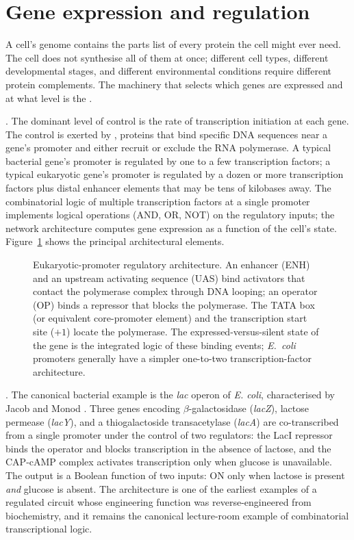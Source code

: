 \section{Gene expression and regulation}

A cell's genome contains the parts list of every protein the cell
might ever need. The cell does not synthesise all of them at once;
different cell types, different developmental stages, and different
environmental conditions require different protein complements. The
machinery that selects which genes are expressed and at what level is
the .

. The dominant level of control is
the rate of transcription initiation at each gene. The control is
exerted by , proteins that bind
specific DNA sequences near a gene's promoter and either recruit or
exclude the RNA polymerase. A typical bacterial gene's promoter is
regulated by one to a few transcription factors; a typical
eukaryotic gene's promoter is regulated by a dozen or more
transcription factors plus distal enhancer elements that may be tens
of kilobases away. The combinatorial logic of multiple transcription
factors at a single promoter implements logical operations (AND, OR,
NOT) on the regulatory inputs; the network architecture computes
gene expression as a function of the cell's state.
Figure~\ref{fig:regulation-circuit} shows the principal architectural
elements.

\begin{figure}[h]
\centering

\caption{Eukaryotic-promoter regulatory architecture. An enhancer
(ENH) and an upstream activating sequence (UAS) bind activators that
contact the polymerase complex through DNA looping; an operator (OP)
binds a repressor that blocks the polymerase. The TATA box (or
equivalent core-promoter element) and the transcription start site
($+1$) locate the polymerase. The expressed-versus-silent state of
the gene is the integrated logic of these binding events;
\emph{E.~coli} promoters generally have a simpler one-to-two
transcription-factor architecture.}
\label{fig:regulation-circuit}
\end{figure}

. The canonical bacterial example is the
\emph{lac} operon of \emph{E. coli}, characterised by Jacob and
Monod \cite{paper:v6c03-jacob-monod-1961}. Three genes encoding
$\beta$-galactosidase (\emph{lacZ}), lactose permease (\emph{lacY}),
and a thiogalactoside transacetylase (\emph{lacA}) are co-transcribed
from a single promoter under the control of two regulators: the LacI
repressor binds the operator and blocks transcription in the absence
of lactose, and the CAP-cAMP complex activates transcription only
when glucose is unavailable. The output is a Boolean function of two
inputs: ON only when lactose is present \emph{and} glucose is absent.
The architecture is one of the earliest examples of a regulated
circuit whose engineering function was reverse-engineered from
biochemistry, and it remains the canonical lecture-room example of
combinatorial transcriptional logic.

